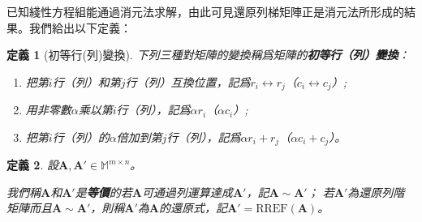 \documentclass[12pt]{article}
\newcommand{\rref}{\mathrm{RREF}}
\newtheorem{definition}{定義}
\begin{document}
    已知綫性方程組能通過消元法求解，由此可見還原列梯矩陣正是消元法所形成的結果。我們給出以下定義：

    \begin{definition}[初等行(列)變換]
        下列三種對矩陣的變換稱爲矩陣的\textbf{初等行（列）變換}：\begin{enumerate}
            \item 把第$i$行（列）和第$j$行（列）互換位置，記爲$r_i\leftrightarrow r_j$（$c_i\leftrightarrow c_j$）;
            \item 用非零數$\alpha$乘以第$i$行（列），記爲$\alpha r_i$（$\alpha c_i$）;
            \item 把第$i$行（列）的$\alpha$倍加到第$j$行（列），記爲$\alpha r_i + r_j$（$\alpha c_i + c_j$）。
        \end{enumerate}
    \end{definition}

    \begin{definition}
        設$\mathbf{A},\mathbf{A}'\in\mathbb{M}^{m\times n}$。
        
        我們稱$\mathbf{A}$和$\mathbf{A}'$是\textbf{等價}的若$\mathbf{A}$可通過列運算達成$\mathbf{A}'$，記$\mathbf{A}\sim\mathbf{A}'$；
        若$\mathbf{A}'$為還原列階矩陣而且$\mathbf{A}\sim\mathbf{A}'$，則稱$\mathbf{A}'$為$\mathbf{A}$的還原式，記$\mathbf{A}'=\rref(\mathbf{A})$。
    \end{definition}
\end{document}
